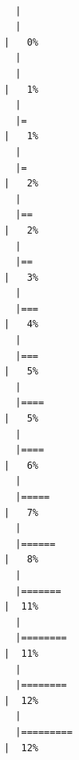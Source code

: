 \documentclass[
  letterpaper,
  DIV=11,
  numbers=noendperiod]{scrreprt}
\begin{document}
\begin{verbatim}

  |                                                                            
  |                                                                      |   0%
  |                                                                            
  |                                                                      |   1%
  |                                                                            
  |=                                                                     |   1%
  |                                                                            
  |=                                                                     |   2%
  |                                                                            
  |==                                                                    |   2%
  |                                                                            
  |==                                                                    |   3%
  |                                                                            
  |===                                                                   |   4%
  |                                                                            
  |===                                                                   |   5%
  |                                                                            
  |====                                                                  |   5%
  |                                                                            
  |====                                                                  |   6%
  |                                                                            
  |=====                                                                 |   7%
  |                                                                            
  |======                                                                |   8%
  |                                                                            
  |=======                                                               |  11%
  |                                                                            
  |========                                                              |  11%
  |                                                                            
  |========                                                              |  12%
  |                                                                            
  |=========                                                             |  12%

\end{verbatim}
\end{document}
